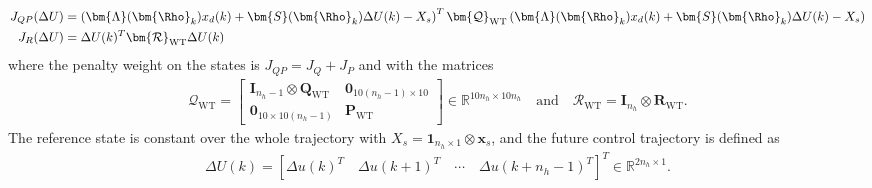 \begin{align*}
    J_{QP}(\Delta U) &= \left(\bm{\Lambda}(\bm{\Rho}_k)x_d(k) + \bm{S}(\bm{\Rho}_k) \Delta U(k)  
    - X_{s}\right)^T \bm{\mathcal{Q}}_{\text{WT}}  \left(\bm{\Lambda}(\bm{\Rho}_k)x_d(k) + \bm{S}(\bm{\Rho}_k) \Delta U(k) - X_{s}\right)\\
    J_R(\Delta U) &= \Delta U(k)^T \bm{\mathcal{R}}_{\text{WT}} \Delta U(k)
\end{align*}
where the penalty weight on the states is $J_{QP} = J_Q + J_P$ and with the matrices
\begin{align*}
     \bm{\mathcal{Q}}_{\text{WT}} =\begin{bmatrix} \bm{I}_{n_h -1} \otimes \bm{Q}_{\text{WT}} & \bm{0}_{10(n_h-1)\times10} \\ \bm{0}_{10\times10(n_h-1)}  & \bm{P}_{\text{WT}}\end{bmatrix} \in \mathbb{R}^{10n_h \times 10n_h}\quad\text{and}\quad   \bm{\mathcal{R}}_{\text{WT}} = \bm{I}_{n_h} \otimes \bm{R}_{\text{WT}}.
\end{align*}
The reference state is constant over the whole trajectory with $X_s = \bm{1}_{n_h \times 1 }\otimes \bm{x}_s$, and the future control trajectory is defined as
\begin{align*}
    \Delta U(k) = \left[\Delta u(k)^T \quad \Delta u(k+1)^T \quad   \cdots  \quad   \Delta u(k+ n_h -1)^T \right]^T \in \mathbb{R}^{2n_h \times 1}.
\end{align*}

